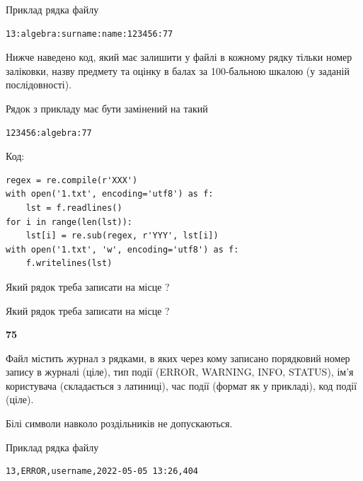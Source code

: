 Приклад рядка файлу



\begin{verbatim}
13:algebra:surname:name:123456:77
\end{verbatim}


Нижче наведено код, який має залишити у файлі в кожному рядку тільки номер заліковки, назву предмету та оцінку в балах за 100-бальною шкалою (у заданій послі\-дов\-ності).

Рядок з прикладу має бути замінений на такий



\begin{verbatim}
123456:algebra:77
\end{verbatim}




Код:



\begin{verbatim}
regex = re.compile(r'XXX')
with open('1.txt', encoding='utf8') as f:
    lst = f.readlines()
for i in range(len(lst)):
    lst[i] = re.sub(regex, r'YYY', lst[i])
with open('1.txt', 'w', encoding='utf8') as f:
    f.writelines(lst)
\end{verbatim}







Який рядок треба записати на місце  ?\par
\vspace{5mm}


Який рядок треба записати на місце  ?\par


\newpage

{\begin {center}\textbf{ 75}\end {center}}\par
Файл  містить журнал з рядками, в яких через кому записано поряд\-ко\-вий номер запису в журналі (ціле), тип події (ERROR, WARNING, INFO, STATUS), ім'я користувача (складається з латиниці), час події (фор\-мат як у прикладі), код події (ціле).

Білі символи навколо роздільників не допускаються.

Приклад рядка файлу



\begin{verbatim}
13,ERROR,username,2022-05-05 13:26,404
\end{verbatim}


